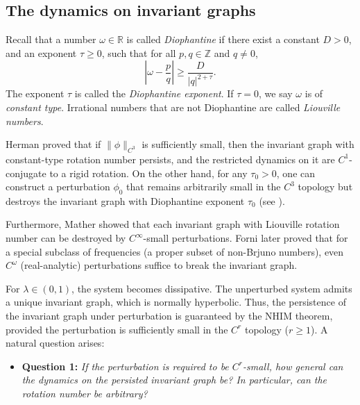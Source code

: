 \documentclass{amsart}
\newcommand{\Z}{\mathbb{Z}}
\theoremstyle{definition}
\begin{document}
\subsection{The dynamics on invariant graphs}
Recall that a number $\omega \in \mathbb{R}$ is called \emph{Diophantine} if there exist a constant \( D > 0 \), and an exponent \( \tau \geq 0 \), such that for all   $p,q\in \Z$ and $q\neq 0$,
\begin{equation}\label{diop}
 \left|\omega - \frac{p}{q}\right| \geq \frac{D}{|q|^{2+\tau}}.
 \end{equation}
The exponent $\tau$ is called the \emph{Diophantine exponent}. If $\tau = 0$, we say $\omega$ is of \emph{constant type}. Irrational numbers that are not Diophantine are called \emph{Liouville numbers}.

Herman \cite{H33} proved that if $\|\phi\|_{C^3}$ is sufficiently small, then the invariant graph with constant-type rotation number persists, and the restricted dynamics on it are $C^1$-conjugate to a rigid rotation. On the other hand, for any $\tau_0 > 0$, one can construct a perturbation $\phi_0$ that remains arbitrarily small in the $C^3$ topology but destroys the invariant graph with Diophantine exponent $\tau_0$ (see \cite{H1,W}).

Furthermore, Mather \cite{M4} showed that each invariant graph with Liouville rotation number can be destroyed by $C^\infty$-small perturbations. Forni \cite{F} later proved that for a special subclass of frequencies (a proper subset of non-Brjuno numbers), even $C^\omega$ (real-analytic) perturbations suffice to break the invariant graph.

For $\lambda \in (0,1)$, the system becomes dissipative. The unperturbed system admits a unique invariant graph, which is normally hyperbolic. Thus, the persistence of the invariant graph under perturbation is guaranteed by the NHIM theorem, provided the perturbation is sufficiently small in the $C^r$ topology ($r\geq 1$). A natural question arises:

\vspace{1ex}


\begin{itemize}
\item \textbf{Question 1:} {\it If the perturbation is  required to be $C^r$-small, how general can the dynamics on the persisted invariant graph be? In particular, can the rotation number be arbitrary?}
\end{itemize}

\vspace{1ex}
\end{document}
